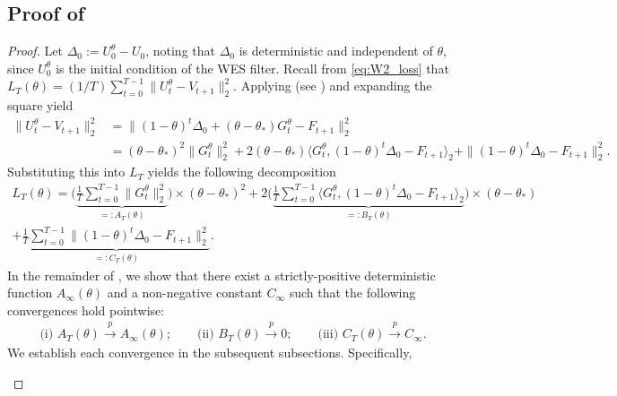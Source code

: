 \documentclass[a4paper, 11pt]{article}
\theoremstyle{definition}
\begin{document}
\subsection{Proof of } \label{apx:proof_pointwise_convergence}

\begin{proof}
    Let $\Delta_0 := U_0^\theta - U_0$, noting that $\Delta_0$ is deterministic and independent of $\theta$, since $U_0^\theta$ is the initial condition of the WES filter.
    Recall from \eqref{eq:W2_loss} that $L_T(\theta) = (1 / T) \sum_{t=0}^{T-1} \| U_{t}^\theta - V_{t+1} \|_2^2$.
    Applying  (see ) and expanding the square yield
    \begin{align}
        \| U_{t}^\theta - V_{t+1} \|_2^2 & = \| (1 - \theta)^{t} \Delta_0 + ( \theta - \theta_* ) G_{t}^\theta - F_{t+1} \|_2^2 \\
        & = ( \theta - \theta_* )^2 \| G_{t}^\theta\|_2^2 + 2 ( \theta - \theta_* ) \big\langle G_{t}^\theta, (1 - \theta)^{t} \Delta_0 - F_{t+1} \big\rangle_2 + \| (1 - \theta)^{t} \Delta_0 - F_{t+1} \|_2^2 .
    \end{align}
    Substituting this into $L_T$ yields the following decomposition
	\begin{multline}
		L_T(\theta) = \bigg( \underbrace{ \frac{1}{T} \sum_{t=0}^{T-1} \| G_{t}^\theta\|_2^2 }_{ =: A_T(\theta) } \bigg) \times (\theta - \theta_*)^2  + 2 \bigg( \underbrace{ \frac{1}{T} \sum_{t=0}^{T-1} \big\langle G_{t}^\theta, (1 - \theta)^{t} \Delta_0 - F_{t+1} \big\rangle_2 }_{ =: B_T(\theta) } \bigg) \times (\theta - \theta_*) \\
        + \underbrace{ \frac{1}{T} \sum_{t=0}^{T-1} \| (1 - \theta)^{t} \Delta_0 - F_{t+1} \|_2^2 }_{ =: C_T(\theta) } .
	\end{multline}
    In the remainder of , we show that there exist a strictly-positive deterministic function $A_\infty(\theta)$ and a non-negative constant $C_\infty$ such that the following convergences hold pointwise:
	\begin{align}
		\text{(i)   } A_T(\theta) \overset{p}{\longrightarrow} A_\infty(\theta); \qquad \text{(ii)   } B_T(\theta) \overset{p}{\longrightarrow} 0; \qquad \text{(iii)   } C_T(\theta) \overset{p}{\longrightarrow} C_\infty .
	\end{align}
    We establish each convergence in the subsequent subsections.
    Specifically, 
    \begin{itemize}

\end{itemize}
\end{proof}
\end{document}
